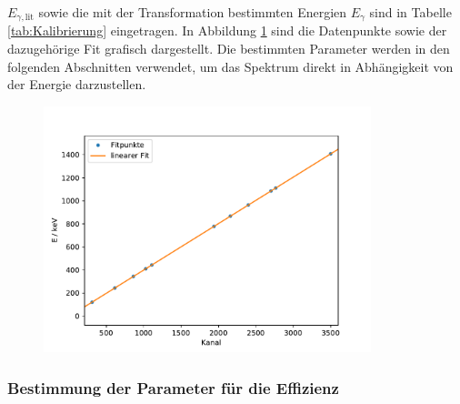 $E_{\gamma, \text{lit}}$ sowie die mit der Transformation bestimmten Energien
$E_{\gamma}$ sind in Tabelle \ref{tab:Kalibrierung} eingetragen. In Abbildung
\ref{fig:Kalibrierung} sind die Datenpunkte sowie der dazugehörige Fit
grafisch dargestellt. Die bestimmten Parameter werden in den folgenden Abschnitten
verwendet, um das Spektrum direkt in Abhängigkeit von der Energie darzustellen.
\begin{figure}
  \centering
  \includegraphics[width = 0.85\textwidth]{Python/Plots/Kalibrierung.pdf}
  \caption{}
  \label{fig:Kalibrierung}
\end{figure}

\subsubsection{Bestimmung der Parameter für die Effizienz}

